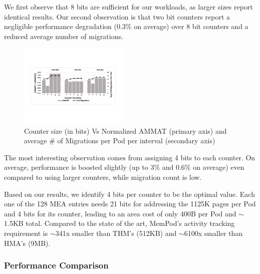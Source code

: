 We first observe that 8 bits are sufficient for our workloads, as larger sizes report identical results. Our second observation is that two bit counters report a negligible performance degradation (0.3\% on average) over 8 bit counters and a reduced average number of migrations.

\begin{figure}[h]
  \includegraphics[width=0.46\textwidth]{figures/counter_size_normalized.pdf}
  \caption{Counter size (in bits) Vs Normalized AMMAT (primary axis) and average \# of Migrations per Pod per interval (secondary axis)}
  \label{fig:counter_size}
\end{figure}

The most interesting observation comes from assigning 4 bits to each counter. On average, performance is boosted slightly (up to 3\% and 0.6\% on average) even compared to using larger counters, while migration count is low. %

Based on our results, we identify 4 bits per counter to be the optimal value. Each one of the 128 MEA entries needs 21 bits for addressing the 1125K pages per Pod and 4 bits for its counter, leading to an area cost of only 400B per Pod and $\sim$1.5KB total. Compared to the state of the art, MemPod's activity tracking requirement is $\sim$341x smaller than THM's (512KB) and $\sim$6100x smaller than HMA's (9MB).

\subsubsection{Performance Comparison}
\label{sub:performance}

